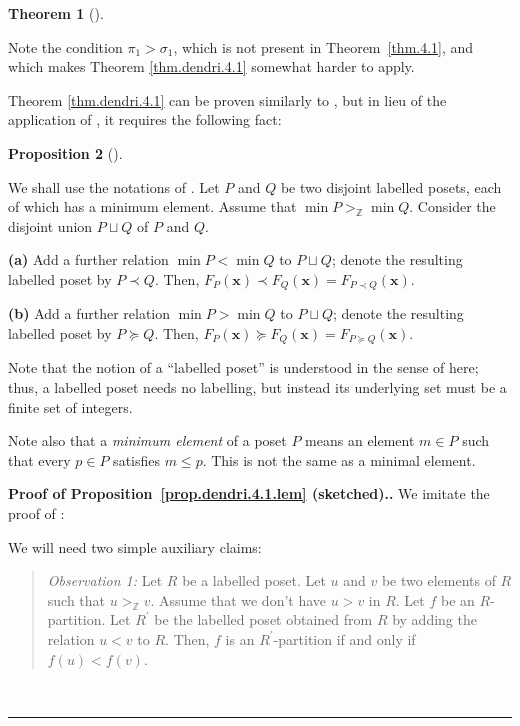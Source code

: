 \documentclass[numbers=enddot,12pt,final,onecolumn,notitlepage]{scrartcl}%
\theoremstyle{definition}
\newtheorem{theo}{Theorem}[section]
\newenvironment{theorem}[1][]
{\begin{theo}[#1]\begin{leftbar}}
{\end{leftbar}\end{theo}}
\newtheorem{prop}[theo]{Proposition}
\newenvironment{proposition}[1][]
{\begin{prop}[#1]\begin{leftbar}}
{\end{leftbar}\end{prop}}
\newenvironment{statement}{\begin{quote}}{\end{quote}}
\newenvironment{proof}[1][Proof]{\noindent\textbf{#1.} }{\ \rule{0.5em}{0.5em}}
\newenvironment{verlong}{}{}
\newcommand{\ZZ}{\mathbb{Z}}
\begin{document}
\begin{verlong}
\begin{theorem}
\end{theorem}

Note the condition $\pi_{1}>\sigma_{1}$, which is not present in
Theorem~\ref{thm.4.1}, and which makes Theorem \ref{thm.dendri.4.1} somewhat
harder to apply.

Theorem \ref{thm.dendri.4.1} can be proven similarly to \cite[(5.2.6)]%
{HopfComb}, but in lieu of the application of \cite[Lemma 5.2.17]{HopfComb},
it requires the following fact:

\begin{proposition}
\label{prop.dendri.4.1.lem}We shall use the notations of \cite[Section
5.2]{HopfComb}. Let $P$ and $Q$ be two disjoint labelled posets, each of which
has a minimum element. Assume that $\min P>_{\mathbb{Z}}\min Q$. Consider the
disjoint union $P\sqcup Q$ of $P$ and $Q$.

\textbf{(a)} Add a further relation $\min P<\min Q$ to $P\sqcup Q$; denote the
resulting labelled poset by $P\left.  \prec\right.  Q$. Then, $F_{P}\left(
\mathbf{x}\right)  \left.  \prec\right.  F_{Q}\left(  \mathbf{x}\right)
=F_{P\left.  \prec\right.  Q}\left(  \mathbf{x}\right)  $.

\textbf{(b)} Add a further relation $\min P>\min Q$ to $P\sqcup Q$; denote the
resulting labelled poset by $P\left.  \succeq\right.  Q$. Then, $F_{P}\left(
\mathbf{x}\right)  \left.  \succeq\right.  F_{Q}\left(  \mathbf{x}\right)
=F_{P\left.  \succeq\right.  Q}\left(  \mathbf{x}\right)  $.
\end{proposition}

Note that the notion of a ``labelled poset'' is understood in the sense
of \cite[Definition 5.2.1]{HopfComb} here; thus, a labelled poset needs no
labelling, but instead its underlying set must be a finite set of integers.

Note also that a \textit{minimum element} of a poset $P$ means an element
$m \in P$ such that every $p \in P$ satisfies $m \leq p$.
This is not the same as a minimal element.

\begin{proof}[Proof of Proposition~\ref{prop.dendri.4.1.lem} (sketched).]
We imitate the proof of \cite[Lemma 5.2.17]{HopfComb}:

We will need two simple auxiliary claims:

\begin{statement}
\textit{Observation 1:} Let $R$ be a labelled poset. Let $u$ and $v$ be
two elements of $R$ such that $u >_{\ZZ} v$.
Assume that we don't have $u > v$ in $R$.
Let $f$ be an $R$-partition.
Let $R^{\prime}$ be the labelled poset obtained from $R$ by adding the
relation $u < v$ to $R$.
Then, $f$ is an $R^{\prime}$-partition if and only if
$f \left(u\right) < f\left(v\right)$.
\end{statement}


\end{proof}
\end{verlong}
\end{document}
